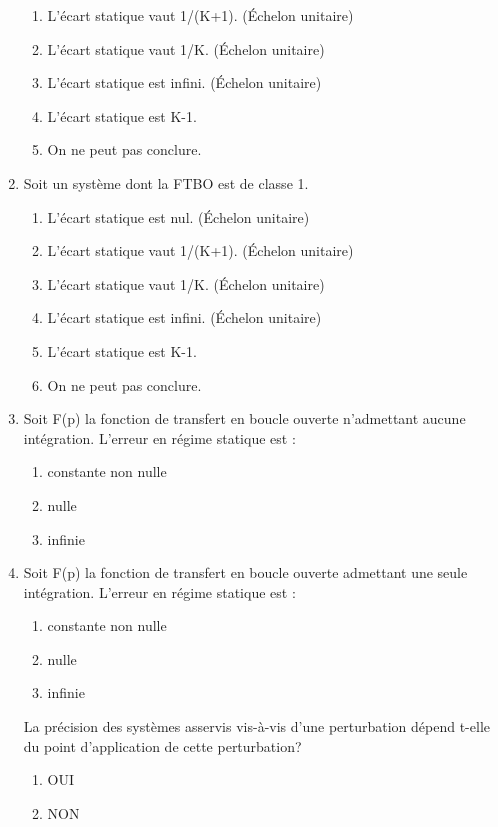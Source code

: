 \documentclass[10pt,fleqn]{article} %
\begin{document}
\begin{multicols}{2}
\begin{enumerate}
\begin{enumerate}
\item L'écart statique vaut 1/(K+1). (Échelon unitaire) 
\item L'écart statique vaut 1/K. (Échelon unitaire) 
\item L'écart statique est infini. (Échelon unitaire)
\item L'écart statique est K-1.
\item On ne peut pas conclure.  
\end{enumerate}
\item Soit un système dont la FTBO est de classe 1.
\begin{enumerate}
\item L'écart statique est nul. (Échelon unitaire)%
\item L'écart statique vaut 1/(K+1). (Échelon unitaire) 
\item L'écart statique vaut 1/K. (Échelon unitaire) 
\item L'écart statique est infini. (Échelon unitaire)
\item L'écart statique est K-1.
\item On ne peut pas conclure.  
\end{enumerate}
\item Soit F(p) la fonction de transfert en boucle ouverte n'admettant aucune intégration. L'erreur en régime statique est :
\begin{enumerate}
\item constante non nulle
\item nulle
\item infinie
\end{enumerate}
\item Soit F(p) la fonction de transfert en boucle ouverte admettant une seule intégration. L'erreur en régime statique est :
\begin{enumerate}
\item constante non nulle
\item nulle %
\item infinie
\end{enumerate}
La précision des systèmes asservis vis-à-vis d'une perturbation dépend t-elle du point d'application de cette perturbation?
\begin{enumerate}
\item OUI
\item NON
\end{enumerate}
\end{enumerate}

\end{multicols}
\end{document}
